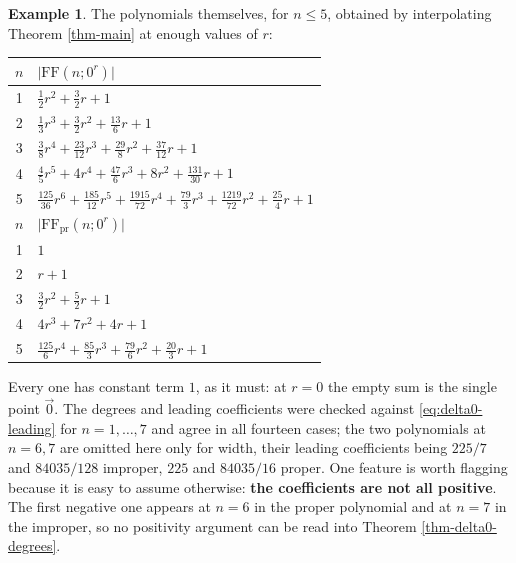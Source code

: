 \documentclass[11pt, a4paper, abstract=yes]{scrartcl}
\theoremstyle{definition}
\newtheorem{mexample}[definition]{Example}
\theoremstyle{remark}
\theoremstyle{plain}
\begin{document}
\begin{mexample}
The polynomials themselves, for \(n\le5\), obtained by interpolating
Theorem \ref{thm-main} at enough values of \(r\):
\begingroup\small
\begin{center}
\begin{tabular}{@{}cl@{}}
  \toprule
  \(n\) & \(\lvert\mathrm{FF}(n;0^r)\rvert\) \\
  \midrule
  1 & \(\tfrac12r^2+\tfrac32r+1\)\\
  2 & \(\tfrac13r^3+\tfrac32r^2+\tfrac{13}6r+1\)\\
  3 & \(\tfrac38r^4+\tfrac{23}{12}r^3+\tfrac{29}8r^2+\tfrac{37}{12}r+1\)\\
  4 & \(\tfrac45r^5+4r^4+\tfrac{47}6r^3+8r^2+\tfrac{131}{30}r+1\)\\
  5 & \(\tfrac{125}{36}r^6+\tfrac{185}{12}r^5+\tfrac{1915}{72}r^4+\tfrac{79}3r^3+\tfrac{1219}{72}r^2+\tfrac{25}4r+1\)\\
  \addlinespace
  \(n\) & \(\lvert\mathrm{FF}_{\mathrm{pr}}(n;0^r)\rvert\) \\
  \midrule
  1 & \(1\)\\
  2 & \(r+1\)\\
  3 & \(\tfrac32r^2+\tfrac52r+1\)\\
  4 & \(4r^3+7r^2+4r+1\)\\
  5 & \(\tfrac{125}6r^4+\tfrac{85}3r^3+\tfrac{79}6r^2+\tfrac{20}3r+1\)\\
  \bottomrule
\end{tabular}
\end{center}
\endgroup
Every one has constant term \(1\), as it must: at \(r=0\) the empty sum is the single point \(\vec0\).
The degrees and leading coefficients were checked against
\eqref{eq:delta0-leading} for \(n=1,\dots,7\) and agree in all fourteen cases; the two polynomials
at \(n=6,7\) are omitted here only for width, their leading coefficients being \(225/7\) and
\(84035/128\) improper, \(225\) and \(84035/16\) proper. One feature is worth flagging because it
is easy to assume otherwise: \textbf{the coefficients are not all positive}. The first negative one appears
at \(n=6\) in the proper polynomial and at \(n=7\) in the improper, so no positivity argument can be
read into Theorem \ref{thm-delta0-degrees}.
\label{tab-delta0-polys}
\end{mexample}
\end{document}
